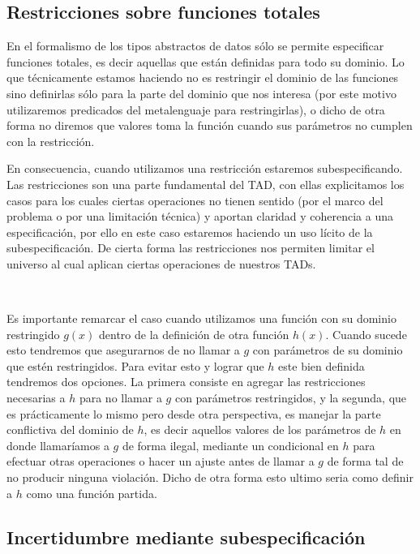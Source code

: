 \subsection{Restricciones sobre funciones totales}

En el formalismo de los tipos abstractos de datos s\'olo se permite especificar funciones totales, es decir aquellas que est\'an definidas para todo su dominio. Lo que t\'ecnicamente estamos haciendo no es restringir el dominio de las funciones sino definirlas s\'olo para la parte del dominio que nos interesa (por este motivo utilizaremos predicados del metalenguaje para restringirlas), o dicho de otra forma no diremos que valores toma la funci\'on cuando sus par\'ametros no cumplen con la restricci\'on. 

En consecuencia, cuando utilizamos una restricci\'on estaremos subespecificando. Las restricciones son una parte fundamental del TAD, con ellas explicitamos los casos para los cuales ciertas operaciones no tienen sentido (por el marco del problema o por una limitaci\'on t\'ecnica) y aportan claridad y coherencia a una especificaci\'on, por ello en este caso estaremos haciendo un uso l\'icito de la subespecificaci\'on. De cierta forma las restricciones nos permiten limitar el universo al cual aplican ciertas operaciones de nuestros TADs.

~

Es importante remarcar el caso cuando utilizamos una funci\'on con su dominio restringido $g(x)$ dentro de la definici\'on de otra funci\'on $h(x)$. Cuando sucede esto tendremos que asegurarnos de no llamar a $g$ con par\'ametros de su dominio que est\'en restringidos. Para evitar esto y lograr que $h$ este bien definida tendremos dos opciones. La primera consiste en agregar las restricciones necesarias a $h$ para no llamar a $g$ con par\'ametros restringidos, y la segunda, que es pr\'acticamente lo mismo pero desde otra perspectiva, es manejar la parte conflictiva del dominio de $h$, es decir aquellos valores de los par\'ametros de $h$ en donde llamar\'iamos a $g$ de forma ilegal, mediante un condicional en $h$ para efectuar otras operaciones o hacer un ajuste antes de llamar a $g$ de forma tal de no producir ninguna violaci\'on. Dicho de otra forma esto ultimo seria como definir a $h$ como una funci\'on partida.

\subsection{Incertidumbre mediante subespecificaci\'on}

